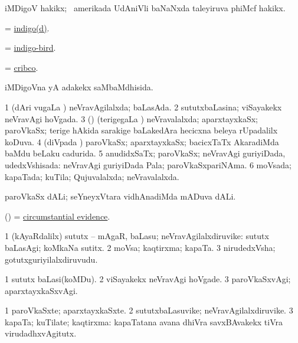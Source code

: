 \bentry
{}
\gl{\nA}
\bmng
iMDigoV hakikx; \kanu\ amerikada UdAniVli baNaNxda taleyiruva phiMcf hakikx. 
\emng
\eentry

\bentry
{}
\gl{\nA}
\bmng
 = \hyperlink{indigo(d)}{indigo(d)}. 
\emng
\eentry

\bentry
{}
\gl{\nA}
\bmng
 = \hyperlink{indigo-bird}{indigo-bird}. 
\emng
\eentry

\bentry
{}
\gl{\nA}
\bmng
= \hyperref{kandict_c.pdf}{C}{cribo}{cribco}. 
\emng
\eentry

\bentry
{}
\gl{\gu}
\bmng
iMDigoVna yA adakekx saMbaMdhisida. 
\emng
\eentry

\bentry
{}
\gl{\gu}
\bmng
\bnum
\num{1} (dAri \mo vugaLa \vi) neVravAgilalxda; baLasAda. 
\num{2} sututxbaLasina; viSayakekx neVravAgi hoVgada. 
\num{3} (\athaRshA) (terigegaLa \vi) neVravalalxda; aparxtayxkaSx; paroVkaSx; terige hAkida sarakige baLakedAra hecicxna beleya rUpadalilx koDuva. 
\num{4} (diVpada \vi) paroVkaSx; aparxtayxkaSx; bacicxTaTx AkaradiMda baMdu beLaku cadurida. 
\num{5} anudidxSaTx; paroVkaSx; neVravAgi guriyiDada, udedxVshisada:  neVravAgi guriyiDada Pala; paroVkaSxpariNAma. 
\num{6} moVsada; kapaTada; kuTila; Qujuvalalxda; neVravalalxda. 
\enum
\emng
\eentry

\bentry
{}
\gl{\nA}
\bmng
paroVkaSx dALi; seYneyxVtara vidhAnadiMda mADuva dALi. 
\emng
\eentry

\bentry
{}
\gl{\nA}
\bmng
(\nAyxshA) = \hyperref{kandict_c.pdf}{C}{circumstantial evidence}{circumstantial evidence}. 
\emng
\eentry

\bentry
{}
\gl{\nA}
\bmng
\bnum
\num{1} (kAyaRdalilx) sututx -- mAgaR, baLasu; neVravAgilalxdiruvike:  sututx baLasAgi; koMkaNa sutitx. 
\num{2} moVsa; kaqtirxma; kapaTa. 
\num{3} nirudedxVsha; gotutxguriyilalxdiruvudu. 
\enum
\emng
\eentry

\bentry
{}
\gl{\kirxvi}
\bmng
\bnum
\num{1} sututx baLasi(koMDu). 
\num{2} viSayakekx neVravAgi hoVgade. 
\num{3} paroVkaSxvAgi; aparxtayxkaSxvAgi. 
\enum
\emng
\eentry

\bentry
{}
\gl{\nA}
\bmng
\bnum
\num{1} paroVkaSxte; aparxtayxkaSxte. 
\num{2} sututxbaLasuvike; neVravAgilalxdiruvike. 
\num{3} kapaTa; kuTilate; kaqtirxma:  kapaTatana avana dhiVra savxBAvakekx tiVra virudadhxvAgitutx. 
\enum
\emng
\eentry

